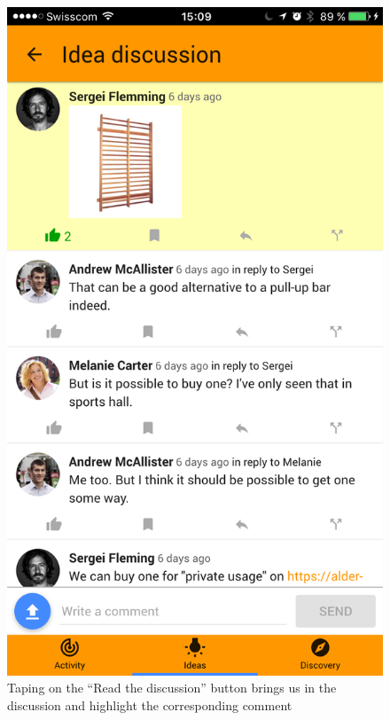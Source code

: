 \documentclass[a4paper,12pt,twoside]{article}
\begin{document}
\begin{figure}[!htb]
\begin{minipage}[t]{.48\textwidth}
        \includegraphics[width=.67\textwidth]{images/flow_recap_4.png}
        \caption{Taping on the “Read the discussion” button brings us in the discussion and highlight the corresponding comment}
    \end{minipage}
\end{figure}
\end{document}
